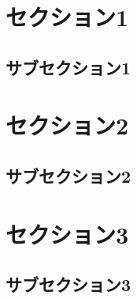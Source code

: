 \documentclass[dvipdfmx]{jsarticle}
\begin{document}
\section{セクション1}
\subsection{サブセクション1}


\section{セクション2}
\subsection{サブセクション2}


\section{セクション3}
\subsection{サブセクション3}


\begin{thebibliography}{99}
\end{thebibliography}
\end{document}
